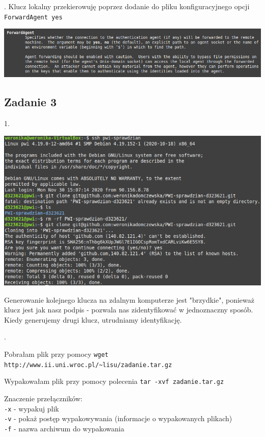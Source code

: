 \documentclass[a4paper]{article}
\begin{document}
. Klucz lokalny przekierowuję poprzez dodanie do pliku konfiguracyjnego opcji \\ \verb+ForwardAgent yes+

\begin{center}
    \includegraphics[scale=0.4]{2_5.png}
\end{center}

\subsection*{Zadanie 3}
1. 

\begin{center}
    \includegraphics[scale=0.4]{3_1.png}
\end{center}

\noindent Generowanie kolejnego klucza na zdalnym komputerze jest "brzydkie", ponieważ klucz jest jak nasz podpis - pozwala nas zidentyfikować w jednoznaczny sposób. Kiedy generujemy drugi klucz, utrudniamy identyfikację.

. 

\noindent Pobrałam plik przy pomocy \verb+wget http://www.ii.uni.wroc.pl/~lisu/zadanie.tar.gz+

\noindent Wypakowałam plik przy pomocy polecenia \verb+tar -xvf zadanie.tar.gz+

\noindent Znaczenie przełączników: \\
\verb+-x+ -  wypakuj plik \\
\verb+-v+ - pokaż postęp wypakowywania (informacje o wypakowanych plikach) \\
\verb+-f+ - nazwa archiwum do wypakowania \\
\end{document}
